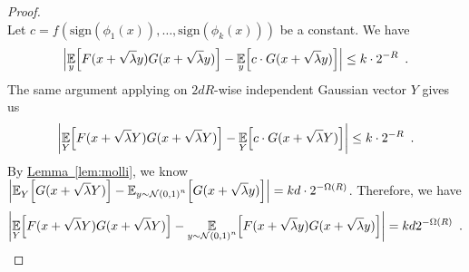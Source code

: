 \documentclass[12pt]{article}
\newcommand{\lem}[1]{\hyperref[lem:#1]{Lemma~\ref*{lem:#1}}}
\newcommand{\sign}[1]{\mathrm{sign}\!\br{#1}}
\newcommand{\br}[1]{\left(#1\right)} \newcommand{\Br}[1]{\left[#1\right]} \newcommand{\st}[1]{\left\{#1\right\}} \newcommand{\tr}[1]{\mathrm{Tr}\!\Br{#1}} \newcommand{\abs}[1]{\left|#1 \right|} \newcommand{\norm}[1]{\left\lVert #1 \right\rVert} \newcommand{\agl}[2]{\theta^{\br{#1}}_{#2}} \newcommand{\aglp}[2]{{\theta'}^{\br{#1}}_{#2}} \newcommand{\lint}[1]{\left\lfloor#1\right\rfloor} \newcommand{\poly}[1]{\mathrm{poly}\!\br{#1}} \newcommand{\negl}[1]{\mathrm{negl}\!\br{#1}} \newcommand{\de}[1]{\mathrm{d}#1} \newcommand{\val}[1]{\mathrm{val}\!\br{#1}} \newcommand{\vall}[1]{\mathrm{val}\br{#1}} \newcommand{\nd}[1]{\mathcal{N}\!\br{#1}} \newcommand{\ketbratwo}[2]{\ket{#1} \hspace{-0.4em}\bra{#2}} \newcommand{\ketbra}[1]{\ketbratwo{#1}{#1}} \newcommand{\id}{\ensuremath{\mathds{1}}} \newcommand{\ogroup}[1]{\mathrm{O}\!\br{#1}} \newcommand{\ugroup}[1]{\mathrm{U}\!\br{#1}} \newcommand{\td}{\mathrm{TD}} \newcommand{\tv}[1]{\norm{#1}_{\mathrm{TV}}} \newcommand {\defeq} {\ensuremath{ \stackrel{\mathrm{def}}{=} }} \newcommand{\vdim}{\ensuremath{N}} \newcommand{\dimin}{\ensuremath{n}} \newcommand{\dimout}{\ensuremath{m}} \newcommand{\ncopy}{\ell} \newcommand{\hspacein}{\H_\mathrm{in}} \newcommand{\hspaceout}{\H_\mathrm{out}} \newcommand{\Sin}{\S(\hspacein)} \newcommand{\Sout}{\S(\hspaceout)} \newcommand{\haar}{\ensuremath{\mu}} \newcommand{\tensorhaar}{\ensuremath{\eta}} \newcommand{\tensorsrss}{\ensuremath{\nu}} \newcommand{\qadvice}{\ensuremath{\rho}} \newcommand{\tp}{\otimes} \newcommand{\wone}[2]{W_1\!\br{#1,#2}}
\begin{document}
\begin{proof}
\[	\]
	Let $c = f\!\br{\sign{\phi_1\!(x)},\dots,\sign{\phi_k\!(x)}}$ be a constant. We have
	\[
	\abs{
		\expect{y}{
			F(x+\sqrt{\lambda}y)G(x+\sqrt{\lambda}y)
		}
		-
		\expect{y}{
			c\cdot G(x+\sqrt{\lambda}y)
		}
	} \leq k\cdot 2^{-R} \enspace .
	\]
	The same argument applying on $2dR$-wise independent Gaussian vector $Y$ gives us
	\[
	\abs{
		\expect{Y}{
			F(x+\sqrt{\lambda}Y)G(x+\sqrt{\lambda}Y)
		}
		-
		\expect{Y}{
			c\cdot G(x+\sqrt{\lambda}Y)
		}
	} \leq k\cdot 2^{-R} \enspace .
	\]
	By \lem{molli}, we know $\abs{
		\expect{Y}{
			G(x+\sqrt{\lambda}Y)
		}
		-
		\expect{y\sim\NN\br{0,1}^n}{
			G(x+\sqrt{\lambda}y)
		}
	} = kd\cdot 2^{-\Omega(R)}$.
	Therefore, we have 
	\[
	\abs{
		\expect{Y}{
			F(x+\sqrt{\lambda}Y)G(x+\sqrt{\lambda}Y)
		}
		-
		\expect{y\sim\NN\br{0,1}^n}{
			F(x+\sqrt{\lambda}y)G(x+\sqrt{\lambda}y)
		}
	} = kd2^{-\Omega(R)} \enspace .
	\]
\end{proof}
\end{document}
